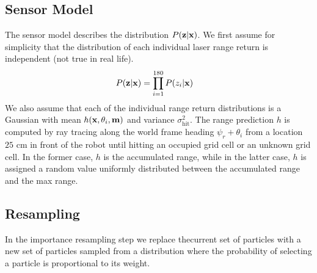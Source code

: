\subsection{Sensor Model}
\label{sec:sensor_model}
The sensor model describes the distribution $P(\mathbf{z} | \mathbf{x})$.
We first assume for simplicity that the distribution of each individual laser range return is independent (not true in real life).
\begin{align}
  P(\mathbf{z} | \mathbf{x}) &= \prod_{i=1}^{180} P(z_i | \mathbf{x}) \label{eq:pzx_indep}
\end{align}
We also assume that each of the individual range return distributions is a Gaussian with mean $h(\mathbf{x},\theta_i, \mathbf{m})$ and variance $\sigma_\text{hit}^2$.
The range prediction $h$ is computed by ray tracing along the world frame heading $\psi_r + \theta_i$ from a location $25$ cm in front of the robot until hitting an occupied grid cell or an unknown grid cell.
In the former case, $h$ is the accumulated range, while in the latter case, $h$ is assigned a random value uniformly distributed between the accumulated range and the max range.


\subsection{Resampling}
In the importance resampling step we replace thecurrent set of particles with a new set of particles sampled from a distribution where the probability of selecting a particle is proportional to its weight.
